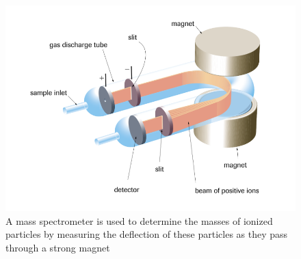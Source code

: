 \begin{figure}[ht!]
    \centering
    \includegraphics[width=0.7 \textwidth]{../figures/mass-spectrometer.png}
    \caption{A mass spectrometer is used to determine the masses of ionized particles by measuring
        the deflection of these particles as they pass through a strong magnet}
    \label{fig:mass-spectrometer}
\end{figure}

